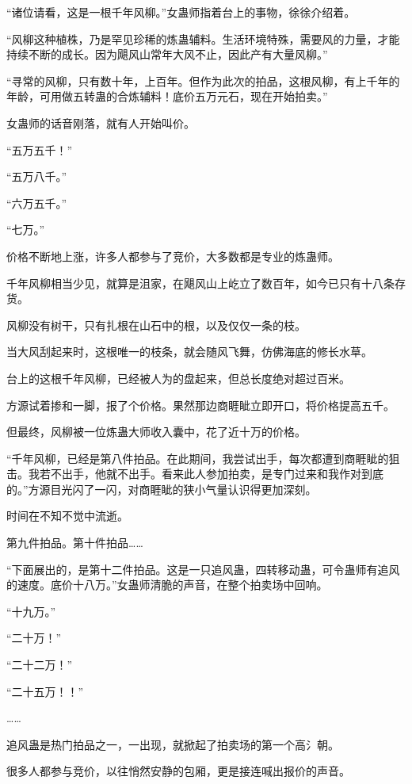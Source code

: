 
\begin{this_body}

“诸位请看，这是一根千年风柳。”女蛊师指着台上的事物，徐徐介绍着。

“风柳这种植株，乃是罕见珍稀的炼蛊辅料。生活环境特殊，需要风的力量，才能持续不断的成长。因为飓风山常年大风不止，因此产有大量风柳。”

“寻常的风柳，只有数十年，上百年。但作为此次的拍品，这根风柳，有上千年的年龄，可用做五转蛊的合炼辅料！底价五万元石，现在开始拍卖。”

女蛊师的话音刚落，就有人开始叫价。

“五万五千！”

“五万八千。”

“六万五千。”

“七万。”

价格不断地上涨，许多人都参与了竞价，大多数都是专业的炼蛊师。

千年风柳相当少见，就算是沮家，在飓风山上屹立了数百年，如今已只有十八条存货。

风柳没有树干，只有扎根在山石中的根，以及仅仅一条的枝。

当大风刮起来时，这根唯一的枝条，就会随风飞舞，仿佛海底的修长水草。

台上的这根千年风柳，已经被人为的盘起来，但总长度绝对超过百米。

方源试着掺和一脚，报了个价格。果然那边商睚眦立即开口，将价格提高五千。

但最终，风柳被一位炼蛊大师收入囊中，花了近十万的价格。

“千年风柳，已经是第八件拍品。在此期间，我尝试出手，每次都遭到商睚眦的狙击。我若不出手，他就不出手。看来此人参加拍卖，是专门过来和我作对到底的。”方源目光闪了一闪，对商睚眦的狭小气量认识得更加深刻。

时间在不知不觉中流逝。

第九件拍品。第十件拍品……

“下面展出的，是第十二件拍品。这是一只追风蛊，四转移动蛊，可令蛊师有追风的速度。底价十八万。”女蛊师清脆的声音，在整个拍卖场中回响。

“十九万。”

“二十万！”

“二十二万！”

“二十五万！！”

……

追风蛊是热门拍品之一，一出现，就掀起了拍卖场的第一个高氵朝。

很多人都参与竞价，以往悄然安静的包厢，更是接连喊出报价的声音。


\end{this_body}
